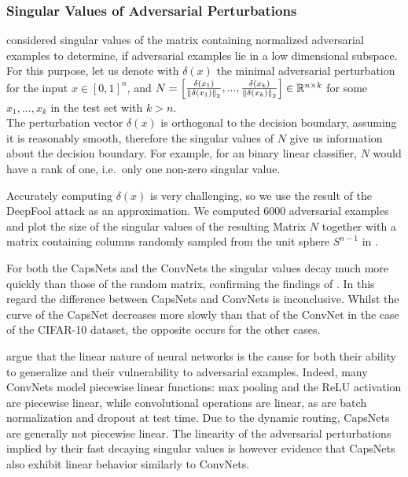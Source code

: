 \subsubsection{Singular Values of Adversarial Perturbations}
\citet{universal} considered singular values of the matrix containing normalized adversarial examples to determine, if adversarial examples lie in a low dimensional subspace. \\
For this purpose, let us denote with $\delta(x)$ the minimal adversarial perturbation for the input $x \in [0,1]^n$,
and $ N = \begin{bmatrix}
\frac{\delta(x_1)} {\left \lVert \delta(x_1) \right \rVert _{2}},  ...,  \frac{\delta(x_k)} {\left \lVert \delta(x_k) \right \rVert _{2}} 
\end{bmatrix}
\in \mathbb{R}^{n \times k}
$ for some $x_1, ..., x_k$ in the test set with $k > n$. \\
The perturbation vector $\delta(x)$ is orthogonal to the decision boundary, assuming it is reasonably smooth, therefore the singular values of $N$ give us information about the decision boundary. For example, for an binary linear classifier, $N$ would have a rank of one, i.e.\ only one non-zero singular value.

Accurately computing $\delta(x)$ is very challenging, so we use the result of the DeepFool attack as an approximation.
We computed $6000$ adversarial examples and plot the size of the singular values of the resulting Matrix $N$ together with a matrix containing columns randomly sampled from the unit sphere $S^{n-1}$ in .

For both the CapsNets and the ConvNets the singular values decay much more quickly than those of the random matrix, confirming the findings of \citet{universal}.
In this regard the difference between CapsNets and ConvNets is inconclusive.
Whilst the curve of the CapsNet decreases more slowly than that of the ConvNet in the case of the CIFAR-10 dataset, the opposite occurs for the other cases.

\citet{fgsm} argue that the linear nature of neural networks is the cause for both their ability to generalize and their vulnerability to adversarial examples.
Indeed, many ConvNets model piecewise linear functions: max pooling and the ReLU activation are piecewise linear, while convolutional operations are linear, as are batch normalization and dropout at test time.
Due to the dynamic routing, CapsNets are generally not piecewise linear.
The linearity of the adversarial perturbations implied by their fast decaying singular values is however evidence that CapsNets also exhibit linear behavior similarly to ConvNets.

